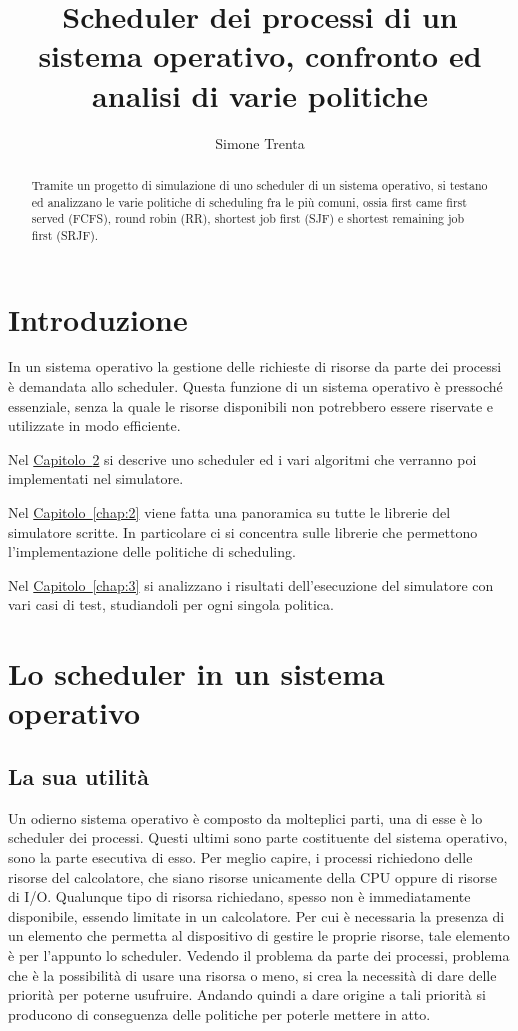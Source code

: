 \documentclass[Lau, oneside]{sapthesis}%
\title{Scheduler dei processi di un sistema operativo, confronto ed analisi di varie politiche}
\author{Simone Trenta}
\begin{document}
\frontmatter
\maketitle

\begin{abstract}
Tramite un progetto di simulazione di uno scheduler di un sistema operativo, si testano ed analizzano le varie politiche di scheduling fra le più comuni, ossia first came first served (FCFS), round robin (RR), shortest job first (SJF) e shortest remaining job first (SRJF).
\end{abstract}

\tableofcontents

\mainmatter
\chapter{Introduzione}
\lettrine[lines=2, findent=3pt, nindent=0pt]{I}{}n un sistema operativo la gestione delle richieste di risorse da parte dei processi è demandata allo scheduler.
Questa funzione di un sistema operativo è pressoché essenziale, senza la quale le risorse disponibili non potrebbero essere riservate e utilizzate in modo efficiente.

\bigskip
Nel \hyperref[chap:1]{Capitolo~\ref*{chap:1}} si descrive uno scheduler ed i vari algoritmi che verranno poi implementati nel simulatore.

\bigskip
Nel \hyperref[chap:2]{Capitolo~\ref*{chap:2}} viene fatta una panoramica su tutte le librerie del simulatore scritte.
In particolare ci si concentra sulle librerie che permettono l'implementazione delle politiche di scheduling.

\bigskip
Nel \hyperref[chap:3]{Capitolo~\ref*{chap:3}} si analizzano i risultati dell'esecuzione del simulatore con vari casi di test, studiandoli per ogni singola politica.

\chapter{Lo scheduler in un sistema operativo}
\label{chap:1} 
\section{La sua utilità}
\label{sec:utilita}
Un odierno sistema operativo è composto da molteplici parti, una di esse è lo scheduler dei processi.
Questi ultimi sono parte costituente del sistema operativo, sono la parte esecutiva di esso.
Per meglio capire, i processi richiedono delle risorse del calcolatore, che siano risorse unicamente della CPU oppure di risorse di I/O.
Qualunque tipo di risorsa richiedano, spesso non è immediatamente disponibile, essendo limitate in un calcolatore.
Per cui è necessaria la presenza di un elemento che permetta al dispositivo di gestire le proprie risorse, tale elemento è per l'appunto lo scheduler.
Vedendo il problema da parte dei processi, problema che è la possibilità di usare una risorsa o meno, si crea la necessità di dare delle priorità per poterne usufruire.
Andando quindi a dare origine a tali priorità si producono di conseguenza delle politiche per poterle mettere in atto.
\end{document}

